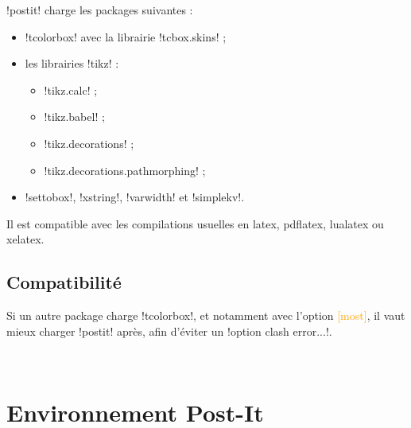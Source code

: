 \documentclass[french,a4paper,11pt]{article}
\newcommand\Cle[1]{{\small\sffamily\textlangle \textcolor{orange}{#1}\textrangle}}
\begin{document}

\begin{noteblock}
\packagetex!postit! charge les packages suivantes :

\begin{itemize}
	\item \packagetex!tcolorbox! avec la librairie \packagetex!tcbox.skins! ;
	\item les librairies \packagetex!tikz! :
	\begin{itemize}
		\item \packagetex!tikz.calc! ;
		\item \packagetex!tikz.babel! ;
		\item \packagetex!tikz.decorations! ;
		\item \packagetex!tikz.decorations.pathmorphing! ;
	\end{itemize}
	\item \packagetex!settobox!, \packagetex!xstring!, \packagetex!varwidth! et \packagetex!simplekv!.
\end{itemize}

Il est compatible avec les compilations usuelles en \textsf{latex}, \textsf{pdflatex}, \textsf{lualatex} ou \textsf{xelatex}.
\end{noteblock}

\subsection{Compatibilité}

\begin{cautionblock}
Si un autre package charge \packagetex!tcolorbox!, et notamment avec l'option \Cle{[most]}, il vaut mieux charger \packagetex!postit! après, afin d'éviter un \motcletex!option clash error...!.
\end{cautionblock}


\vfill~

\pagebreak

\section{Environnement Post-It}
\end{document}
